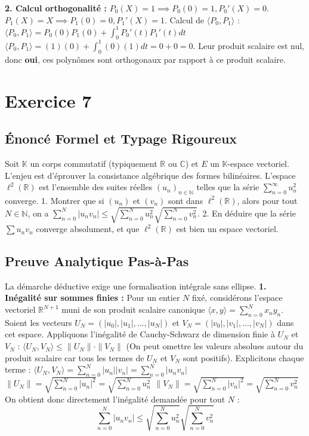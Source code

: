 \documentclass[11pt,a4paper]{report}
\begin{document}
\textbf{2. Calcul orthogonalité :}
$P_0(X) = 1 \implies P_0(0) = 1, P_0'(X) = 0$.
$P_1(X) = X \implies P_1(0) = 0, P_1'(X) = 1$.
Calcul de $\langle P_0, P_1 \rangle$ :
$\langle P_0, P_1 \rangle = P_0(0)P_1(0) + \int_0^1 P_0'(t)P_1'(t) dt$
$\langle P_0, P_1 \rangle = (1)(0) + \int_0^1 (0)(1) dt = 0 + 0 = 0$.
Leur produit scalaire est nul, donc \textbf{oui}, ces polynômes sont orthogonaux par rapport à ce produit scalaire.


\section{Exercice 7}


\subsection*{Énoncé Formel et Typage Rigoureux}
Soit $\mathbb{K}$ un corps commutatif (typiquement $\mathbb{R}$ ou $\mathbb{C}$) et $E$ un $\mathbb{K}$-espace vectoriel. L'enjeu est d'éprouver la consistance algébrique des formes bilinéaires.
L'espace $\ell^2(\mathbb{R})$ est l'ensemble des suites réelles $(u_n)_{n \in \mathbb{N}}$ telles que la série $\sum_{n=0}^\infty u_n^2$ converge.
1. Montrer que si $(u_n)$ et $(v_n)$ sont dans $\ell^2(\mathbb{R})$, alors pour tout $N \in \mathbb{N}$, on a $\sum_{n=0}^N |u_n v_n| \le \sqrt{\sum_{n=0}^N u_n^2} \sqrt{\sum_{n=0}^N v_n^2}$.
2. En déduire que la série $\sum u_n v_n$ converge absolument, et que $\ell^2(\mathbb{R})$ est bien un espace vectoriel.

\subsection*{Preuve Analytique Pas-à-Pas}
La démarche déductive exige une formalisation intégrale sans ellipse.
\textbf{1. Inégalité sur sommes finies :}
Pour un entier $N$ fixé, considérons l'espace vectoriel $\mathbb{R}^{N+1}$ muni de son produit scalaire canonique $\langle x, y \rangle = \sum_{n=0}^N x_n y_n$.
Soient les vecteurs $U_N = (|u_0|, |u_1|, ..., |u_N|)$ et $V_N = (|v_0|, |v_1|, ..., |v_N|)$ dans cet espace.
Appliquons l'inégalité de Cauchy-Schwarz de dimension finie à $U_N$ et $V_N$ :
$\langle U_N, V_N \rangle \le \|U_N\| \cdot \|V_N\|$
(On peut omettre les valeurs absolues autour du produit scalaire car tous les termes de $U_N$ et $V_N$ sont positifs).
Explicitons chaque terme :
$\langle U_N, V_N \rangle = \sum_{n=0}^N |u_n| |v_n| = \sum_{n=0}^N |u_n v_n|$
$\|U_N\| = \sqrt{\sum_{n=0}^N |u_n|^2} = \sqrt{\sum_{n=0}^N u_n^2}$
$\|V_N\| = \sqrt{\sum_{n=0}^N |v_n|^2} = \sqrt{\sum_{n=0}^N v_n^2}$
On obtient donc directement l'inégalité demandée pour tout $N$ :
$$\sum_{n=0}^N |u_n v_n| \le \sqrt{\sum_{n=0}^N u_n^2} \sqrt{\sum_{n=0}^N v_n^2}$$
\end{document}
